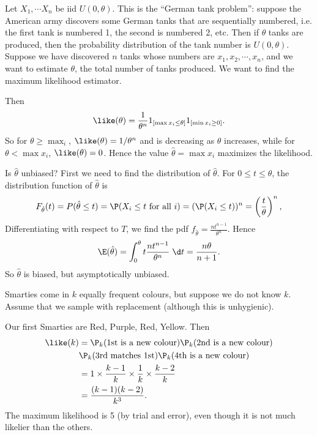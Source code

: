 \documentclass[a4paper]{article}
\begin{document}
\begin{eg}
  Let $X_1, \cdots X_n$ be iid $U(0, \theta)$. This is the ``German tank problem'': suppose the American army discovers some German tanks that are sequentially numbered, i.e. the first tank is numbered 1, the second is numbered 2, etc. Then if $\theta$ tanks are produced, then the probability distribution of the tank number is $U(0, \theta)$. Suppose we have discovered $n$ tanks whose numbers are $x_1, x_2, \cdots, x_n$, and we want to estimate $\theta$, the total number of tanks produced. We want to find the maximum likelihood estimator.

  Then
  \[
    \like(\theta) = \frac{1}{\theta^n}1_{[\max x_i \leq \theta]}1_{[\min x_i\geq 0]}.
  \]
  So for $\theta\geq \max _i$, $\like (\theta) = 1/\theta^n$ and is decreasing as $\theta$ increases, while for $\theta < \max x_i$, $\like (\theta) = 0$. Hence the value $\hat{\theta} = \max x_i$ maximizes the likelihood.

  Is $\hat{\theta}$ unbiased? First we need to find the distribution of $\hat{\theta}$. For $0 \leq t \leq \theta$, the distribution function of $\hat{\theta}$ is
  \[
    F_{\hat{\theta}}(t) = P(\hat{\theta} \leq t) = \P(X_i \leq t \text{ for all }i) = (\P(X_i \leq t))^n = \left(\frac{t}{\theta}\right)^n,
  \]
  Differentiating with respect to $T$, we find the pdf $f_{\hat{\theta}} = \frac{nt^{n - 1}}{\theta^n}$. Hence
  \[
    \E(\hat{\theta}) = \int_0^\theta t\frac{nt^{n - 1}}{\theta^n} \;\d t = \frac{n\theta}{n + 1}.
  \]
  So $\hat{\theta}$ is biased, but asymptotically unbiased.
\end{eg}

\begin{eg}
  Smarties come in $k$ equally frequent colours, but suppose we do not know $k$. Assume that we sample with replacement (although this is unhygienic).

  Our first Smarties are Red, Purple, Red, Yellow. Then
  \begin{align*}
  \like(k)&=\P_k(\text{1st is a new colour})\P_k(\text{2nd is a new colour})\\\
  & \P_k(\text{3rd matches 1st})\P_k(\text{4th is a new colour})\\
  &= 1\times \frac{k - 1}{k}\times \frac{1}{k}\times \frac{k - 2}{k}\\
  &= \frac{(k - 1)(k - 2)}{k^3}.
\end{align*}
The maximum likelihood is 5 (by trial and error), even though it is not much likelier than the others.
\end{eg}
\end{document}
